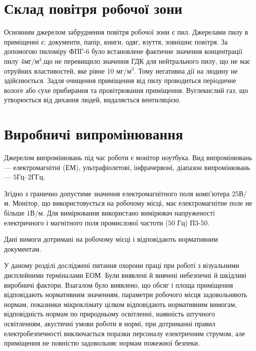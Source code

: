 \section{Склад повітря робочої зони}

Основним джерелом забруднення повітря робочої зони є пил. 
Джерелами пилу в приміщенні є: документи, папір, книги, одяг, взуття, зовнішнє
повітря.
За допомогою пиломіру ФПГ-6 було встановлене фактичне значення концентрації
пилу 4мг/м$^3$,що не перевищило значення ГДК для нейтрального пилу,
що не має отруйних властивостей, яке рівне 10 мг/м$^3$. 
Тому негативна дії на людину не здійснюється. 
Задля очищення приміщення від пилу проводиться періодичне вологе
або сухе прибирання та провітрювання приміщення. 
Вуглекислий газ, що утворюється від дихання людей, видаляється вентиляцією.

\section{Виробничі випромінювання}

Джерелом випромінювань під час роботи є монітор ноутбука. 
Вид випромінювань --- електромагнітні (ЕМ), ультрафіолетові, інфрачервоні,
діапазон випромінювань --- $5$Гц–$2$ГГц.

Згідно з \cite{DSN} гранично допустиме значення електромагнітного поля
комп’ютера $25$В/м.
Монітор, що використовується на робочому місці, має електромагнітне поле
не більше $1$В/м.
Для вимірювання використано вимірювач напруженості електричного
і магнітного поля промислової частоти ($50$ Гц) П3-50.

Дані вимоги дотримані на робочому місці і відповідають нормативним документам.

\chapterConclusion

У даному розділі досліджені питання охорони праці при роботі з візуальними
дисплейними терміналами ЕОМ.
Були виявлені й вивчені небезпечні й шкідливі виробничі фактори.
Взагалом було виявлено, що
обсяг і площа приміщення  відповідають нормативним значенням,
параметри робочого місця задовольняють нормам,
показники мікроклімату цілком відповідають нормативним вимогам,
відповідність нормам по природньому освітленні, наявність штучного освітленням,
акустичні умови роботи в нормі,
при дотриманні правил електробезпечності виключається поразки персоналу
електричним струмом,
але приміщення не повністю задовольняє нормам пожежної безпеки.
